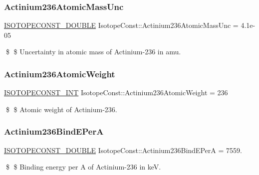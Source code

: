 \subsubsection{\texorpdfstring{Actinium236\+Atomic\+Mass\+Unc}{Actinium236AtomicMassUnc}}
{\footnotesize\ttfamily \mbox{\hyperlink{group___isotope_const-_macros_ga8f45a7272ce02c0b4c65c44636ed719a}{I\+S\+O\+T\+O\+P\+E\+C\+O\+N\+S\+T\+\_\+\+D\+O\+U\+B\+LE}} Isotope\+Const\+::\+Actinium236\+Atomic\+Mass\+Unc = 4.\+1e-\/05}

\$ \$ Uncertainty in atomic mass of Actinium-\/236 in amu. \mbox{\label{group___isotope_const-_actinium-_ac236_ga9cceea54f0b8ca0b9a45cb95d846a780}} 
\subsubsection{\texorpdfstring{Actinium236\+Atomic\+Weight}{Actinium236AtomicWeight}}
{\footnotesize\ttfamily \mbox{\hyperlink{group___isotope_const-_macros_ga5f18360b3e99483a35c32d789e62621c}{I\+S\+O\+T\+O\+P\+E\+C\+O\+N\+S\+T\+\_\+\+I\+NT}} Isotope\+Const\+::\+Actinium236\+Atomic\+Weight = 236}

\$ \$ Atomic weight of Actinium-\/236. \mbox{\label{group___isotope_const-_actinium-_ac236_ga31a4618ff4373359bf0640749311b757}} 
\subsubsection{\texorpdfstring{Actinium236\+Bind\+E\+PerA}{Actinium236BindEPerA}}
{\footnotesize\ttfamily \mbox{\hyperlink{group___isotope_const-_macros_ga8f45a7272ce02c0b4c65c44636ed719a}{I\+S\+O\+T\+O\+P\+E\+C\+O\+N\+S\+T\+\_\+\+D\+O\+U\+B\+LE}} Isotope\+Const\+::\+Actinium236\+Bind\+E\+PerA = 7559.}

\$ \$ Binding energy per A of Actinium-\/236 in keV. \mbox{\label{group___isotope_const-_actinium-_ac236_gacff25c046593aab9cd9bd2051ae1bfc2}} 
